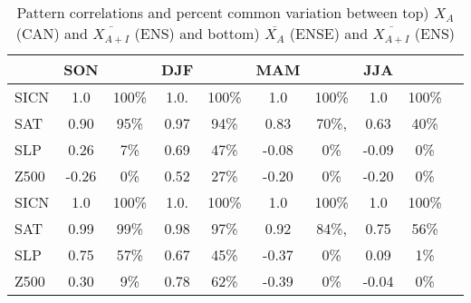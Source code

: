 \documentclass[12pt]{article}
\begin{document}
\begin{table}[t]
\caption{Pattern correlations and percent common variation between top) $X_A$ (CAN) and $\overline{X_{A+I}}$ (ENS) and bottom) $\overline{X_{A}}$ (ENSE) and $\overline{X_{A+I}}$ (ENS)}\label{tbl:corrs}
\begin{center}
\begin{tabular}{l|cc|cc|cc|ccc}
\hline\hline
           & SON      &                 & DJF &                & MAM &       & JJA &    \\
\hline
SICN & 1.0       &  100\%    & 1.0.    & 100\% & 1.0       &  100\% & 1.0    &  100\% \\
SAT  & 0.90        &  95\%        & 0.97    & 94\%   & 0.83    & 70\%,   &  0.63   &   40\%  \\
SLP &  0.26      &   7\%       & 0.69  &  47\%      & -0.08    & 0\%      &  -0.09  & 0\%   \\
Z500   & -0.26  & 0\%        & 0.52     & 27\%      &  -0.20  & 0\%      &  -0.20 & 0\% \\
\hline
\hline
SICN & 1.0       &  100\%    & 1.0.    & 100\% & 1.0       &  100\% & 1.0    &  100\% \\
SAT  & 0.99        &  99\%        & 0.98    & 97\%   & 0.92    & 84\%,   &  0.75   &   56\%  \\
SLP &  0.75      &   57\%       & 0.67  &  45\%      & -0.37    & 0\%      &  0.09  & 1\%   \\
Z500   & 0.30   & 9\%        & 0.78     & 62\%      &  -0.39  & 0\%      &  -0.04 & 0\% \\
\hline
\end{tabular}
\end{center}
\end{table}








\clearpage


\end{document}
